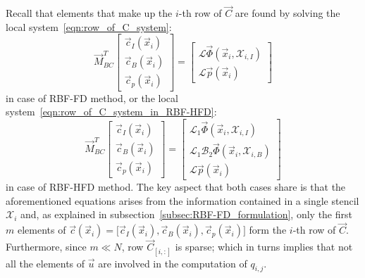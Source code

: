 Recall that elements that make up the $i$-th row of $\vec{C}$ are found by solving the local system~\eqref{eqn:row_of_C_system}:
\begin{equation}
	\label{eqn:local_RBF-FD_system_adjoint_1D}
	\vec{M}_{BC}^T
	\begin{bmatrix}
		\vec{c}_I(\vec{x}_i)  \\
		\vec{c}_B(\vec{x}_i)  \\
		\vec{c}_p(\vec{x}_i)
	\end{bmatrix} = 
	\begin{bmatrix}
		\mathcal{L} \vec{\Phi}(\vec{x}_i, \mathcal{X}_{i,I})  \\
		\mathcal{L} \vec{p}(\vec{x}_i)
	\end{bmatrix}
\end{equation}
in case of RBF-FD method, or the local system~\eqref{eqn:row_of_C_system_in_RBF-HFD}:
\begin{equation}
	\label{eqn:adjoint_method_row_of_C_system_in_RBF-HFD}
	\vec{M}_{BC}^T
	\begin{bmatrix}
		\vec{c}_I(\vec{x}_i)  \\
		\vec{c}_B(\vec{x}_i)  \\
		\vec{c}_p(\vec{x}_i)
	\end{bmatrix} = 
	\begin{bmatrix}
		\mathcal{L}_1 \vec{\Phi}(\vec{x}_i, \mathcal{X}_{i,I})  			  \\
		\mathcal{L}_1 \mathcal{B}_2 \vec{\Phi}(\vec{x}_i, \mathcal{X}_{i,B})  \\
		\mathcal{L} \vec{p}(\vec{x}_i)
	\end{bmatrix}
\end{equation}
in case of RBF-HFD method. The key aspect that both cases share is that the aforementioned equations arises from the information contained in a single stencil $\mathcal{X}_i$ and, as explained in subsection~\ref{subsec:RBF-FD_formulation}, only the first $m$ elements of $\vec{c}(\vec{x}_i) = \bigl[ \vec{c}_I(\vec{x}_i), \vec{c}_B(\vec{x}_i), \vec{c}_p(\vec{x}_i) \bigr]$ form the $i$-th row of $\vec{C}$. 
Furthermore, since $m \ll N$, row $\vec{C}_{[i,:]}$ is sparse; which in turns implies that not all the elements of $\vec{u}$ are involved in the computation of $q_{i,j}$.

